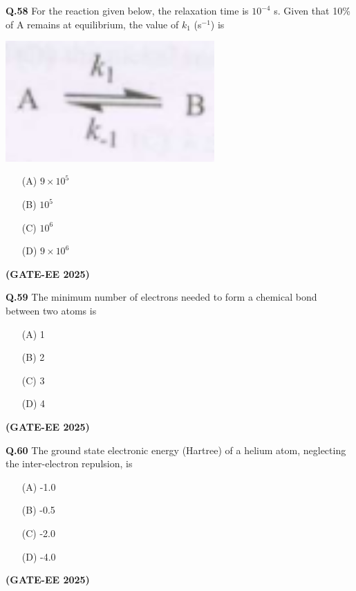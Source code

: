 \documentclass[12pt]{article}
\begin{document}
\begin{enumerate}
\textbf{Q.58} For the reaction given below, the relaxation time is $10^{-4}$ s. Given that 10\% of A remains at equilibrium, the value of $k_1$ (s$^{-1}$) is

\begin{center}
\includegraphics[width=0.6\textwidth]{q58.png}
\end{center}

\begin{enumerate}
\item[(A)] $9 \times 10^5$
\item[(B)] $10^5$
\item[(C)] $10^6$
\item[(D)] $9 \times 10^6$
\end{enumerate}   \textbf{(GATE-EE 2025)}


\vspace{0.5cm}

\textbf{Q.59} The minimum number of electrons needed to form a chemical bond between two atoms is

\begin{enumerate}
\item[(A)] 1
\item[(B)] 2
\item[(C)] 3
\item[(D)] 4
\end{enumerate}   \textbf{(GATE-EE 2025)}


\vspace{0.5cm}

\textbf{Q.60} The ground state electronic energy (Hartree) of a helium atom, neglecting the inter-electron repulsion, is

\begin{enumerate}
\item[(A)] -1.0
\item[(B)] -0.5
\item[(C)] -2.0
\item[(D)] -4.0
\end{enumerate}   \textbf{(GATE-EE 2025)}


\vspace{0.5cm}


\end{enumerate}
\end{document}
